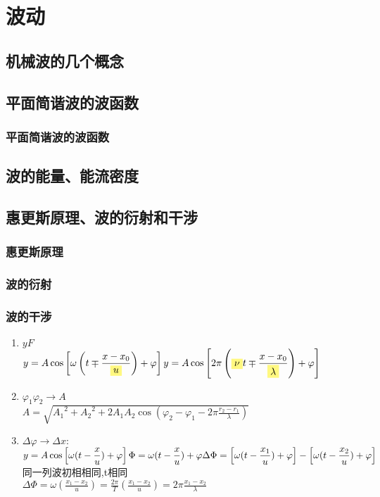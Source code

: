\documentclass[UTF8,a4paper,12pt,scheme=chinese]{ctexart}
\newcommand{\hla}[1]{%
	\colorbox{yellow!50}{$\displaystyle#1$}}
\begin{document}
	\section{波动}
	\subsection{机械波的几个概念}
	\subsection{平面简谐波的波函数}
	\subsubsection{平面简谐波的波函数}
	\subsection{波的能量、能流密度}
	\subsection{惠更斯原理、波的衍射和干涉}
	\subsubsection{惠更斯原理}
	\subsubsection{波的衍射}
	\subsubsection{波的干涉}
	\begin{enumerate}
		\item $yF$\\
		$\displaystyle
		y=A\cos\left[\omega\left(t\mp\frac{x-x_0}{\hla{u}}\right)+\varphi\right]\\
		y=A\cos\left[2\pi\left(\hla{\nu} t\mp\frac{x-x_0}{\hla{\lambda}}\right)+\varphi\right]
		$
		\item $\varphi_1\varphi_2\rightarrow A$\\
		$\displaystyle
		A=\sqrt{{A_1}^2+{A_2}^2+2A_1A_2\cos\left(\varphi_2-\varphi_1-2\pi\frac{r_2-r_1}{\lambda}\right)}$
		\item $\Delta \varphi \rightarrow \Delta x:$\\
		$\displaystyle
		y=A\cos \left[\omega(t-\frac{x}{u})+\varphi\right]\\
		\Phi = \omega(t-\frac{x}{u})+\varphi\\
		\Delta \Phi = \left[\omega(t-\frac{x_1}{u})+\varphi\right] - \left[\omega(t-\frac{x_2}{u})+\varphi\right]
		$\\
		同一列波初相相同,t相同\\
		$\displaystyle
		\Delta \Phi = \omega\left(\frac{x_1-x_2}{u}\right) = \frac{2\pi}{T}\left(\frac{x_1-x_2}{u}\right) = 2\pi\frac{x_1-x_2}{\lambda}
		$
	\end{enumerate}
\end{document}
